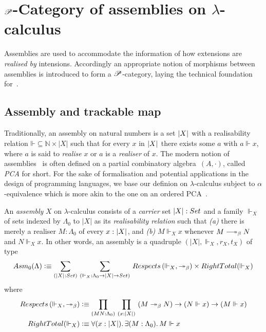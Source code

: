 \documentclass[a4paper,UKenglish,numberwithinsect,cleveref,thm-restate]{lipics-v2021}
\numberwithin{equation}{section}
\theoremstyle{definition}
\theoremstyle{plain}
\begin{document}
\section{\texorpdfstring{$\mathscr{P}$}{P}-Category of assemblies on \texorpdfstring{$\lambda$}{λ}-calculus}\label{sec:assemblies}

Assemblies are used to accommodate the information of how extensions are \emph{realised by} intensions.
Accordingly an appropriate notion of morphisms between assemblies is introduced to form a $\mathscr{P}$-category, laying
the technical foundation for~.


\subsection{Assembly and trackable map}
Traditionally, an assembly on natural numbers is a set $\mathopen{}\left|X\right|_{}^{}\mathclose{}$ with a realisability relation $\mathord{\Vdash} \subseteq \mathbb{N} \times |X|$ such that for every $x$ in $\mathopen{}\left|X\right|_{}^{}\mathclose{}$ there exists some $a$ with $a \Vdash x$, where $a$ is said to \emph{realise} $x$ or $a$ is a \emph{realiser} of $x$.
The modern notion of assemblies~\cite{Oosten2008} is often defined on a partial  combinatory algebra~$(A, \cdot)$, called \emph{PCA} for short.
For the sake of formalisation and potential applications in the design of programming languages, we base our definion on $\lambda$-calculus subject to $\alpha$-equivalence which is more akin to the one on an ordered PCA~\cite{Hofstra2003}. 

\begin{definition}\label{def:assembly}
  An \emph{assembly} $X$ on $\lambda$-calculus consists of a \emph{carrier} set $|X| : \set$ and a family ${\Vdash_X}$ of sets indexed by $\Lambda_0$ to $|X|$ as its \emph{realisability relation} such that
  \emph{(a)} there is merely a realiser $M : \Lambda_0$ of every $x : \mathopen{}\left|X\right|_{}^{}\mathclose{}$, and
  \emph{(b)} $M \Vdash_X x$ whenever $M \reduce N$ and $N \Vdash_X x$.
  In other words, an assembly is a quadruple $(|X|, \Vdash_X, r_X, t_X)$ of type
  \[
    \Asm_0(\Lambda) \defeq \sm{\bproj{X} : {\set}}{\mathord{\Vdash_X}:\Lambda_0 \to |X| \to \set} 
      \mathsf{Respects}\left(\Vdash_X, \mathord{\twoheadrightarrow_\beta}\right)
      \times \mathsf{RightTotal}({\Vdash_X})
  \]
  where
  \begin{align}
    \mathsf{Respects}\left(\mathord{\Vdash_X}, \mathord{\twoheadrightarrow_\beta}\right) & \defeq\prd{M N : \Lambda_0}{x : |X|} \left(M \twoheadrightarrow_ \beta N\right) \to \left(N \Vdash x\right) \to \left(M \Vdash x\right) \label{eq:respect-reduction} \\      
    \mathsf{RightTotal}(\Vdash_X) & \defeq \fall{x : |X|}\exis{M : \Lambda_0} M \Vdash x
    \label{eq:right-total}
  \end{align}
\end{definition}
\end{document}
